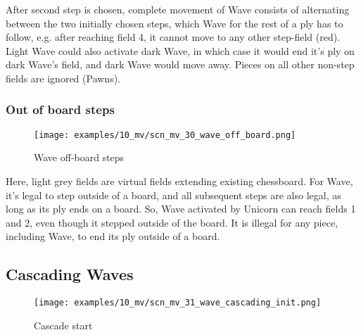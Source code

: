 After second step is chosen, complete movement of Wave consists of alternating between the two initially
chosen steps, which Wave for the rest of a ply has to follow, e.g. after reaching field 4, it cannot move
to any other step-field (red). Light Wave could also activate dark Wave, in which case it would end it's
ply on dark Wave's field, and dark Wave would move away. Pieces on all other non-step fields are ignored
(Pawns).

\clearpage %

\subsubsection*{Out of board steps}
\label{sec:Miranda's veil/Wave/Movement/Out of board steps}

\vspace*{-1.4\baselineskip}
\noindent
\begin{figure}[!h]
\texttt{[image: examples/10\_mv/scn\_mv\_30\_wave\_off\_board.png]}
\caption{Wave off-board steps}
\label{fig:scn_mv_30_wave_off_board}
\end{figure}

Here, light grey fields are virtual fields extending existing chessboard.
For Wave, it's legal to step outside of a board, and all subsequent steps
are also legal, as long as its ply ends on a board. So, Wave activated by
Unicorn can reach fields 1 and 2, even though it stepped outside of the
board. It is illegal for any piece, including Wave, to end its ply outside
of a board.

\clearpage %

\subsection*{Cascading Waves}
\label{sec:Miranda's veil/Wave/Cascading Waves}

\vspace*{-1.4\baselineskip}
\noindent
\begin{figure}[h]
\texttt{[image: examples/10\_mv/scn\_mv\_31\_wave\_cascading\_init.png]}
\caption{Cascade start}
\label{fig:scn_mv_31_wave_cascading_init}
\end{figure}

